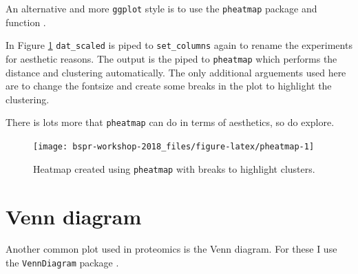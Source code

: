 \documentclass[12pt,]{book}
\newenvironment{Shaded}{\begin{snugshade}}{\end{snugshade}}
\newcommand{\KeywordTok}[1]{\textcolor[rgb]{0.13,0.29,0.53}{\textbf{#1}}}
\newcommand{\DataTypeTok}[1]{\textcolor[rgb]{0.13,0.29,0.53}{#1}}
\newcommand{\DecValTok}[1]{\textcolor[rgb]{0.00,0.00,0.81}{#1}}
\newcommand{\StringTok}[1]{\textcolor[rgb]{0.31,0.60,0.02}{#1}}
\newcommand{\CommentTok}[1]{\textcolor[rgb]{0.56,0.35,0.01}{\textit{#1}}}
\newcommand{\OperatorTok}[1]{\textcolor[rgb]{0.81,0.36,0.00}{\textbf{#1}}}
\newcommand{\NormalTok}[1]{#1}
\theoremstyle{definition}
\theoremstyle{definition}
\theoremstyle{definition}
\theoremstyle{remark}
\begin{document}
An alternative and more \texttt{ggplot} style is to use the
\texttt{pheatmap} package and function \citep{R-pheatmap}.

In Figure \ref{fig:pheatmap} \texttt{dat\_scaled} is piped to
\texttt{set\_columns} again to rename the experiments for aesthetic
reasons. The output is the piped to \texttt{pheatmap} which performs the
distance and clustering automatically. The only additional arguements
used here are to change the fontsize and create some breaks in the plot
to highlight the clustering.

There is lots more that \texttt{pheatmap} can do in terms of aesthetics,
so do explore.




\begin{Shaded}
\end{Shaded}

\begin{figure}

{\centering \texttt{[image: bspr-workshop-2018\_files/figure-latex/pheatmap-1]} 

}

\caption{Heatmap created using \texttt{pheatmap} with breaks to
highlight clusters.}\label{fig:pheatmap}
\end{figure}

\section{Venn diagram}\label{venn-diagram}

Another common plot used in proteomics is the Venn diagram. For these I
use the \texttt{VennDiagram} package \citep{R-VennDiagram}.
\end{document}
